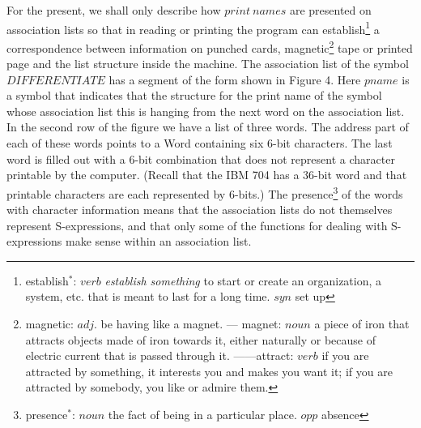 \documentclass[11pt, a4paper]{article}
\begin{document}
For the present, we shall only describe how $print \ names$ are presented on
association lists so that in reading or printing the program can
establish\footnote{establish$^*$: $verb$ \textit{establish something} to start
  or create an organization, a system, etc. that is meant to last for a long
  time. $syn$ set up}
a
correspondence between information on punched cards,
magnetic\footnote{magnetic: $adj.$ be having like a magnet. --- magnet: $noun$ a
  piece of iron that attracts objects made of iron towards it, either naturally
  or because of electric current that is passed through it. ------attract:
  $verb$ if you are attracted by something, it interests you and makes you want
  it; if you are attracted by somebody, you like or admire them.}
tape or printed
page and the list structure inside the machine. The association list of the
symbol $DIFFERENTIATE$ has a segment of the form shown in Figure 4. Here $pname$
is a symbol that indicates that the structure for the print name of the symbol
whose association list this is hanging from the next word on the association
list. In the second row of the figure we have a list of three words. The address
part of each of these words points to a Word containing six 6-bit
characters. The last word is filled out with a 6-bit combination that does not
represent a character printable by the computer. (Recall that the IBM 704 has a
36-bit word and that printable characters are each represented by 6-bits.) The
presence\footnote{presence$^*$: $noun$ the fact of being in a particular
  place. $opp$ absence}
of the words with character information means that the association
lists do not themselves represent S-expressions, and that only some of the
functions for dealing with S-expressions make sense within an association list.
\end{document}

